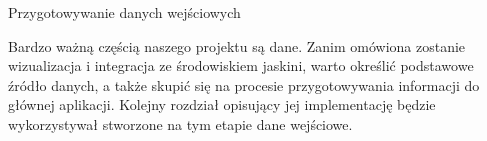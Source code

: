 \begin{chapter}{Przygotowywanie danych wejściowych}
	\newcommand{\chapterPath}{rozdzialy/3_dane}

	Bardzo ważną częścią naszego projektu są dane. Zanim omówiona zostanie wizualizacja i integracja ze środowiskiem jaskini, warto określić podstawowe źródło danych, a także skupić się na procesie przygotowywania informacji do głównej aplikacji. Kolejny rozdział opisujący jej implementację będzie wykorzystywał stworzone na tym etapie dane wejściowe.

	
	
	
	
	
\end{chapter}
